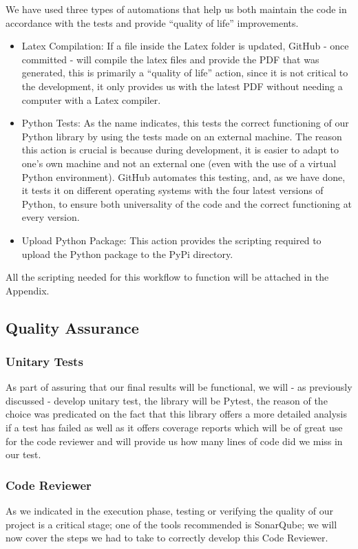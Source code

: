 We have used three types of automations that help us both maintain the code in accordance with the tests and provide ``quality of life'' improvements.
\begin{itemize}
    \item Latex Compilation: If a file inside the Latex folder is updated, GitHub - once committed - will compile the latex files and provide the PDF that was generated, this is primarily a ``quality of life'' action, since it is not critical to the development, it only provides us with the latest PDF without needing a computer with a Latex compiler.
    \item Python Tests: As the name indicates, this tests the correct functioning of our Python library by using the tests made on an external machine. The reason this action is crucial is because during development, it is easier to adapt to one's own machine and not an external one (even with the use of a virtual Python environment). GitHub automates this testing, and, as we have done, it tests it on different operating systems with the four latest versions of Python, to ensure both universality of the code and the correct functioning at every version.
    \item Upload Python Package: This action provides the scripting required to upload the Python package to the PyPi directory.
\end{itemize}
All the scripting needed for this workflow to function will be attached in the Appendix.
\subsection{Quality Assurance}
\subsubsection{Unitary Tests}
As part of assuring that our final results will be functional, we will - as previously discussed - develop unitary test, the library will be Pytest, the reason of the choice was predicated on the fact that this library offers a more detailed analysis if a test has failed as well as it offers coverage reports which will be of great use for the code reviewer and will provide us how many lines of code did we miss in our test.

\subsubsection{Code Reviewer}
As we indicated in the execution phase, testing or verifying the quality of our project is a critical stage; one of the tools recommended is SonarQube; we will now cover the steps we had to take to correctly develop this Code Reviewer.

